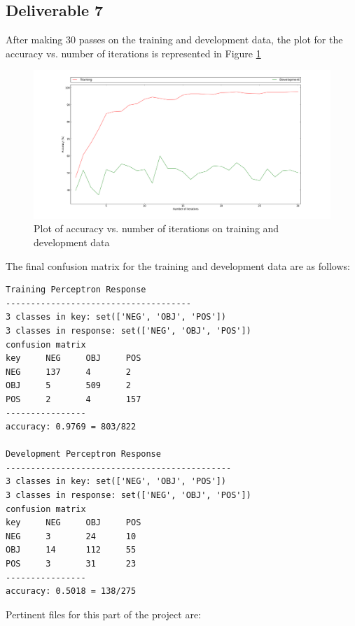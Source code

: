\documentclass[10pt, letter]{article}
\begin{document}
\subsection*{Deliverable 7}
After making 30 passes on the training and development data, the plot for the accuracy vs. number of iterations is represented in Figure \ref{del7}
\begin{figure}
  \centering
    \includegraphics[scale=0.25]{images/deliverable_7}
    \caption{Plot of accuracy vs. number of iterations on training and development data}
  \label{del7}
\end{figure}
The final confusion matrix for the training and development data are as follows:
\begin{verbatim}
Training Perceptron Response
-------------------------------------
3 classes in key: set(['NEG', 'OBJ', 'POS'])
3 classes in response: set(['NEG', 'OBJ', 'POS'])
confusion matrix
key     NEG     OBJ     POS
NEG     137     4       2
OBJ     5       509     2
POS     2       4       157
----------------
accuracy: 0.9769 = 803/822

Development Perceptron Response
---------------------------------------------
3 classes in key: set(['NEG', 'OBJ', 'POS'])
3 classes in response: set(['NEG', 'OBJ', 'POS'])
confusion matrix
key     NEG     OBJ     POS
NEG     3       24      10
OBJ     14      112     55
POS     3       31      23
----------------
accuracy: 0.5018 = 138/275
\end{verbatim}
Pertinent files for this part of the project are:
\end{document}
